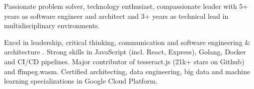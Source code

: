 

\begin{cvparagraph}

Passionate problem solver, technology enthusiast, compassionate leader with 5+ years as software engineer and architect and 3+ years as technical lead in multidisciplinary environments.

Excel in leadership, critical thinking, communication and software engineering \& architecture . Strong skills in JavaScript (incl. React, Express), Golang, Docker and CI/CD pipelines. Major contributor of tesseract.js (21k+ stars on Github) and ffmpeg.wasm. Certified architecting, data engineering, big data and machine learning specializations in Google Cloud Platform. 
\end{cvparagraph}
